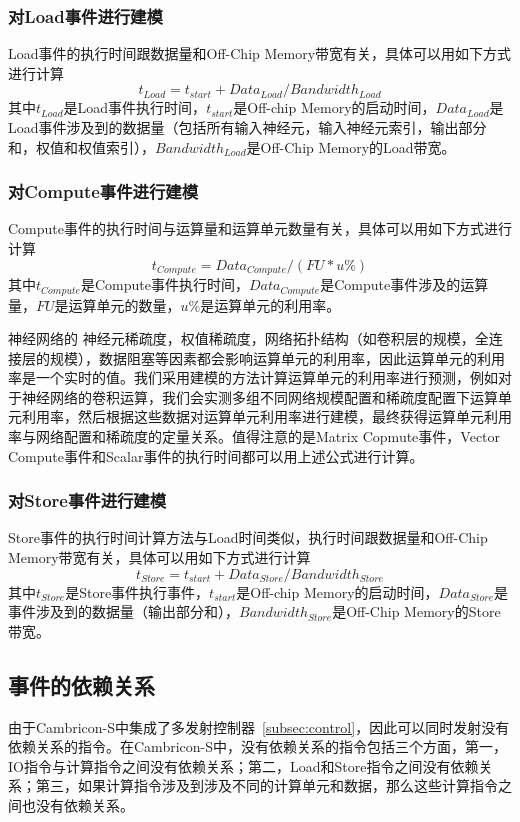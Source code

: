 \subsubsection{对Load事件进行建模}
Load事件的执行时间跟数据量和Off-Chip Memory带宽有关，具体可以用如下方式进行计算
\begin{equation}
t_{Load} = t_{start} + Data_{Load} / Bandwidth_{Load}
\end{equation}
其中$t_{Load}$是Load事件执行时间，$t_{start}$是Off-chip Memory的启动时间，$Data_{Load}$是Load事件涉及到的数据量（包括所有输入神经元，输入神经元索引，输出部分和，权值和权值索引），$Bandwidth_{Load}$是Off-Chip Memory的Load带宽。

\subsubsection{对Compute事件进行建模}
Compute事件的执行时间与运算量和运算单元数量有关，具体可以用如下方式进行计算
\begin{equation}
t_{Compute} = Data_{Compute} / (FU * u\%)
\end{equation}
其中$t_{Compute}$是Compute事件执行时间，$Data_{Compute}$是Compute事件涉及的运算量，$FU$是运算单元的数量，$u\%$是运算单元的利用率。

神经网络的 神经元稀疏度，权值稀疏度，网络拓扑结构（如卷积层的规模，全连接层的规模），数据阻塞等因素都会影响运算单元的利用率，因此运算单元的利用率是一个实时的值。我们采用建模的方法计算运算单元的利用率进行预测，例如对于神经网络的卷积运算，我们会实测多组不同网络规模配置和稀疏度配置下运算单元利用率，然后根据这些数据对运算单元利用率进行建模，最终获得运算单元利用率与网络配置和稀疏度的定量关系。值得注意的是Matrix Copmute事件，Vector Compute事件和Scalar事件的执行时间都可以用上述公式进行计算。

\subsubsection{对Store事件进行建模}
Store事件的执行时间计算方法与Load时间类似，执行时间跟数据量和Off-Chip Memory带宽有关，具体可以用如下方式进行计算
\begin{equation}
t_{Store} = t_{start} + Data_{Store} / Bandwidth_{Store}
\end{equation}
其中$t_{Store}$是Store事件执行事件，$t_{start}$是Off-chip Memory的启动时间，$Data_{Store}$是事件涉及到的数据量（输出部分和），$Bandwidth_{Store}$是Off-Chip Memory的Store带宽。


\subsection{事件的依赖关系}
由于Cambricon-S中集成了多发射控制器~\ref{subsec:control}，因此可以同时发射没有依赖关系的指令。在Cambricon-S中，没有依赖关系的指令包括三个方面，第一，IO指令与计算指令之间没有依赖关系；第二，Load和Store指令之间没有依赖关系；第三，如果计算指令涉及到涉及不同的计算单元和数据，那么这些计算指令之间也没有依赖关系。

